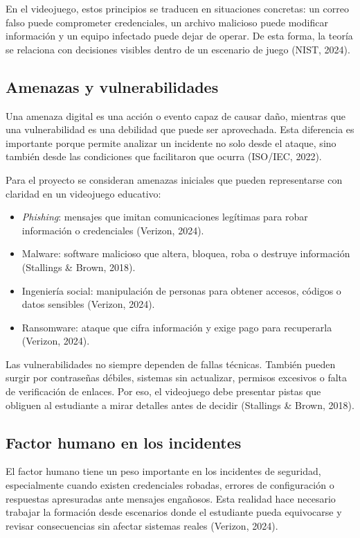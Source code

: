 En el videojuego, estos principios se traducen en situaciones concretas: un correo falso puede comprometer credenciales, un archivo malicioso puede modificar información y un equipo infectado puede dejar de operar. De esta forma, la teoría se relaciona con decisiones visibles dentro de un escenario de juego (NIST, 2024).

\subsection{Amenazas y vulnerabilidades}

Una amenaza digital es una acción o evento capaz de causar daño, mientras que una vulnerabilidad es una debilidad que puede ser aprovechada. Esta diferencia es importante porque permite analizar un incidente no solo desde el ataque, sino también desde las condiciones que facilitaron que ocurra (ISO/IEC, 2022).

Para el proyecto se consideran amenazas iniciales que pueden representarse con claridad en un videojuego educativo:

\begin{itemize}
    \item \textit{Phishing}: mensajes que imitan comunicaciones legítimas para robar información o credenciales (Verizon, 2024).
    \item Malware: software malicioso que altera, bloquea, roba o destruye información (Stallings \& Brown, 2018).
    \item Ingeniería social: manipulación de personas para obtener accesos, códigos o datos sensibles (Verizon, 2024).
    \item Ransomware: ataque que cifra información y exige pago para recuperarla (Verizon, 2024).
\end{itemize}

Las vulnerabilidades no siempre dependen de fallas técnicas. También pueden surgir por contraseñas débiles, sistemas sin actualizar, permisos excesivos o falta de verificación de enlaces. Por eso, el videojuego debe presentar pistas que obliguen al estudiante a mirar detalles antes de decidir (Stallings \& Brown, 2018).

\subsection{Factor humano en los incidentes}

El factor humano tiene un peso importante en los incidentes de seguridad, especialmente cuando existen credenciales robadas, errores de configuración o respuestas apresuradas ante mensajes engañosos. Esta realidad hace necesario trabajar la formación desde escenarios donde el estudiante pueda equivocarse y revisar consecuencias sin afectar sistemas reales (Verizon, 2024).

